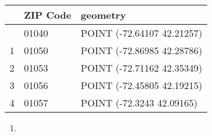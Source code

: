 \documentclass[
  letterpaper,
  DIV=11,
  numbers=noendperiod]{scrartcl}
\providecommand{\tightlist}{%
  \setlength{\itemsep}{0pt}\setlength{\parskip}{0pt}}\usepackage{longtable,booktabs,array}
\begin{document}
\begin{longtable}[]{@{}lll@{}}
\toprule\noalign{}
& ZIP Code & geometry \\
\midrule\noalign{}
\endhead
\bottomrule\noalign{}
\endlastfoot
0 & 01040 & POINT (-72.64107 42.21257) \\
1 & 01050 & POINT (-72.86985 42.28786) \\
2 & 01053 & POINT (-72.71162 42.35349) \\
3 & 01056 & POINT (-72.45805 42.19215) \\
4 & 01057 & POINT (-72.3243 42.09165) \\
\end{longtable}

\begin{enumerate}
\def\labelenumi{\arabic{enumi}.}
\setcounter{enumi}{1}
\tightlist
\item
\end{enumerate}
\end{document}
